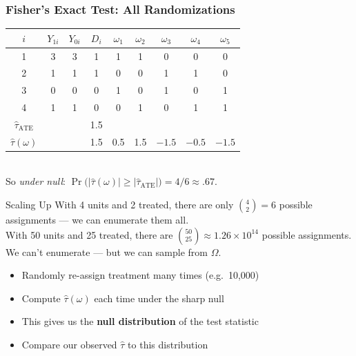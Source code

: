 \documentclass[xcolor=dvipsnames]{beamer}
\begin{document}
\begin{frame}
\frametitle{Fisher's Exact Test: All Randomizations}
\smallskip
\begin{tabular}{@{} c c c c !{\color{gray!50}\vrule} c c c c c @{}}
\toprule
$i$ & $Y_{1i}$ & $Y_{0i}$ & $D_i$ & $\omega_1$ & $\omega_2$ & $\omega_3$ & $\omega_4$ & $\omega_5$ \\
 & 3 & \textcolor{red!70!black}{3} & 1 & 1 & 1 & 0 & 0 & 0 \\
                    2 & 1 & \textcolor{red!70!black}{1} & 1 & 0 & 0 & 1 & 1 & 0 \\
  3 & \textcolor{red!70!black}{0} & 0 & 0 & 1 & 0 & 1 & 0 & 1 \\
  4 & \textcolor{red!70!black}{1} & 1 & 0 & 0 & 1 & 0 & 1 & 1 \\
\midrule
$\widehat{\tau}_{\text{ATE}}$ & & & 1.5 & & & & & \\
$\hat\tau(\omega)$ & & & 1.5 & 0.5 & 1.5 & $-1.5$ & $-0.5$ & $-1.5$ \\
\bottomrule
\end{tabular}
\vspace{.2in}\\
So \textit{under null}: $\Pr\!\bigl(|\hat\tau(\omega)| \geq |\widehat{\tau}_{\text{ATE}}|\bigr)=4/6\approx.67$.
\end{frame}


\begin{frame}{Scaling Up}
\small
With 4 units and 2 treated, there are only $\binom{4}{2}=6$ possible assignments --- we can enumerate them all.\\
\bigskip
{} With 50 units and 25 treated, there are $\binom{50}{25} \approx 1.26 \times 10^{14}$ possible assignments.\\
\bigskip
{} We can't enumerate --- but we can \alert{sample} from $\Omega$.\\
\medskip
\begin{itemize}
\item<3-> Randomly re-assign treatment many times (e.g.\ 10,000)
\item<4-> Compute $\hat\tau(\omega)$ each time under the sharp null
\item<5-> This gives us the \textbf{null distribution} of the test statistic
\item<6-> Compare our observed $\hat\tau$ to this distribution
\end{itemize}
\end{frame}
\end{document}

